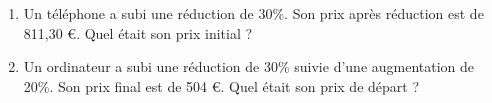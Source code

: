 \documentclass[12pt,a4paper]{article}
\begin{document}
\begin{enumerate}
    \item Un téléphone a subi une réduction de 30\%. Son prix après réduction est de 811{,}30 €. Quel était son prix initial ?\\
    \begin{tcolorbox}[colframe=black, colback=white, width=\linewidth, height=4cm]
    \end{tcolorbox}

    \item Un ordinateur a subi une réduction de 30\% suivie d’une augmentation de 20\%. Son prix final est de 504 €. Quel était son prix de départ ?\\
    \begin{tcolorbox}[colframe=black, colback=white, width=\linewidth, height=4cm]
    \end{tcolorbox}
\end{enumerate}
\end{document}
